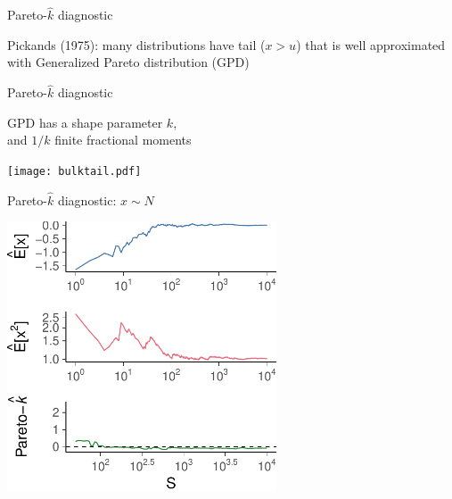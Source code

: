 \documentclass[english,t]{beamer}
\begin{document}

\begin{frame}{Pareto-$\hat{k}$ diagnostic}

   Pickands (1975): many distributions have tail ($x > u$) that
    is well approximated with Generalized Pareto distribution (GPD)

    {
      \vspace{-0.5\baselineskip}
}

\end{frame}

\begin{frame}{Pareto-$\hat{k}$ diagnostic}

 GPD has a shape parameter $k$,\\and $1/k$ finite fractional
    moments

    {
      \vspace{-0.5\baselineskip}
  \texttt{[image: bulktail.pdf]}
}

\end{frame}

\begin{frame}{Pareto-$\hat{k}$ diagnostic: $x \sim N$}

  \includegraphics[width=8cm]{k1c.pdf}

\end{frame}
\end{document}
